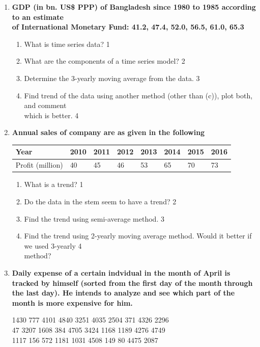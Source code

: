 \documentclass[a4paper,oneside]{book}
\begin{document}
\begin{enumerate}
 \item
	  \textbf{GDP (in bn. US\$ PPP) of Bangladesh since 1980 to 1985 according to an estimate \\ of International  Monetary Fund: 41.2, 47.4, 52.0, 56.5, 61.0, 65.3}
  \begin{enumerate}
    \item
	What is time series data? \hfill 1
    \item
	What are the components of a time series model? \hfill 2
    \item  
	Determine the 3-yearly moving average from the data. \hfill 3
    \item
	Find trend of the data using another method (other than (c)), plot both, and comment \\ which is better. \hfill 4
\end{enumerate}

 \item
	  \textbf{Annual sales of company are as given in the following}\
	  
	  \begin{table}[h]
	  \centering
\begin{tabular}{l|l|l|l|l|l|l|l}
Year & 2010 & 2011 & 2012 & 2013 & 2014 & 2015 & 2016 \\ \hline
Profit (million) & 40 & 45 & 46 & 53 & 65 & 70 & 73
\end{tabular}
\end{table}

  \begin{enumerate}
    \item
	What is a trend? \hfill 1
    \item
	Do the data in the stem seem to have a trend? \hfill 2
    \item  
	Find the trend using semi-average method. \hfill 3
    \item
	Find the trend using 2-yearly moving average method. Would it better if we used 3-yearly  \hfill 4 \\  method?
\end{enumerate}

 \item
	  \textbf{Daily expense of a certain indvidual in the month of April is tracked by himself (sorted from the first day of the month through the last day). He intends to analyze and see which part of the month is more expensive for him.}
	  
	  \begin{center}
1430  777 4101 4840 3251 4035 2504  371 4326 2296 \\
47 3207 1608  384 4705 3424 1168 1189 4276 4749 \\
1117  156  572 1181 1031 4508  149   80 4475 2087
\end{center}
  

\end{enumerate}
\end{document}
